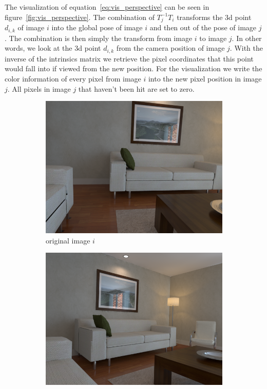         The visualization of equation~\ref{eq:vis_perspective} can be seen in figure~\ref{fig:vis_perspective}.
        The combination of $T_j^{-1}T_i$ transforms the 3d point $d_{i,k}$ of image $i$ into the global pose of image $i$ and then out of the pose of image $j$.
        The combination is then simply the transform from image $i$ to image $j$.
        In other words, we look at the 3d point $d_{i,k}$ from the camera position of image $j$.
        With the inverse of the intrinsics matrix we retrieve the pixel coordinates that this point would fall into if viewed from the new position.
        For the visualization we write the color information of every pixel from image $i$ into the new pixel position in image $j$.
        All pixels in image $j$ that haven't been hit are set to zero.
        \begin{figure}[h]
            \centering
            \begin{subfigure}[b]{.45\textwidth}
                \includegraphics[width=.95\textwidth]{images/vis_perspective_01}
                \caption{original image $i$}
                \label{sfig:i_original}
            \end{subfigure}
            \begin{subfigure}[b]{.45\textwidth}
                \includegraphics[width=.95\textwidth]{images/vis_perspective_03}

\end{subfigure}
\end{figure}
